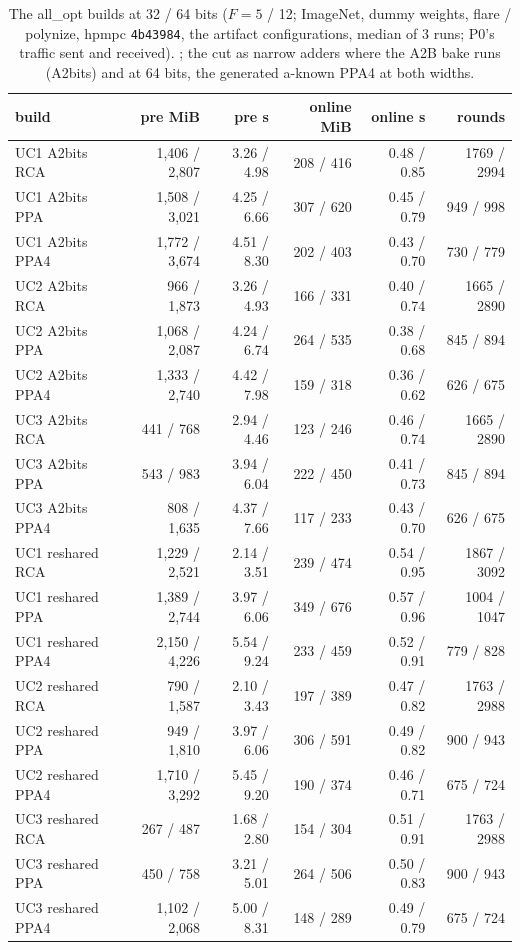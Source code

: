 \begin{table}[t]
\centering\small
\begin{tabular}{@{}lrrrrr@{}}
\toprule
build & pre MiB & pre s & online MiB & online s & rounds\\
\midrule
UC1 A2bits RCA & 1{,}406 / 2{,}807 & 3.26 / 4.98 & 208 / 416 & 0.48 / 0.85 & 1769 / 2994\\
UC1 A2bits PPA & 1{,}508 / 3{,}021 & 4.25 / 6.66 & 307 / 620 & 0.45 / 0.79 & 949 / 998\\
UC1 A2bits PPA4 & 1{,}772 / 3{,}674 & 4.51 / 8.30 & 202 / 403 & 0.43 / 0.70 & 730 / 779\\
UC2 A2bits RCA & 966 / 1{,}873 & 3.26 / 4.93 & 166 / 331 & 0.40 / 0.74 & 1665 / 2890\\
UC2 A2bits PPA & 1{,}068 / 2{,}087 & 4.24 / 6.74 & 264 / 535 & 0.38 / 0.68 & 845 / 894\\
UC2 A2bits PPA4 & 1{,}333 / 2{,}740 & 4.42 / 7.98 & 159 / 318 & 0.36 / 0.62 & 626 / 675\\
UC3 A2bits RCA & 441 / 768 & 2.94 / 4.46 & 123 / 246 & 0.46 / 0.74 & 1665 / 2890\\
UC3 A2bits PPA & 543 / 983 & 3.94 / 6.04 & 222 / 450 & 0.41 / 0.73 & 845 / 894\\
UC3 A2bits PPA4 & 808 / 1{,}635 & 4.37 / 7.66 & 117 / 233 & 0.43 / 0.70 & 626 / 675\\
\addlinespace
UC1 reshared RCA & 1{,}229 / 2{,}521 & 2.14 / 3.51 & 239 / 474 & 0.54 / 0.95 & 1867 / 3092\\
UC1 reshared PPA & 1{,}389 / 2{,}744 & 3.97 / 6.06 & 349 / 676 & 0.57 / 0.96 & 1004 / 1047\\
UC1 reshared PPA4 & 2{,}150 / 4{,}226 & 5.54 / 9.24 & 233 / 459 & 0.52 / 0.91 & 779 / 828\\
UC2 reshared RCA & 790 / 1{,}587 & 2.10 / 3.43 & 197 / 389 & 0.47 / 0.82 & 1763 / 2988\\
UC2 reshared PPA & 949 / 1{,}810 & 3.97 / 6.06 & 306 / 591 & 0.49 / 0.82 & 900 / 943\\
UC2 reshared PPA4 & 1{,}710 / 3{,}292 & 5.45 / 9.20 & 190 / 374 & 0.46 / 0.71 & 675 / 724\\
UC3 reshared RCA & 267 / 487 & 1.68 / 2.80 & 154 / 304 & 0.51 / 0.91 & 1763 / 2988\\
UC3 reshared PPA & 450 / 758 & 3.21 / 5.01 & 264 / 506 & 0.50 / 0.83 & 900 / 943\\
UC3 reshared PPA4 & 1{,}102 / 2{,}068 & 5.00 / 8.31 & 148 / 289 & 0.49 / 0.79 & 675 / 724\\
\bottomrule
\end{tabular}
\caption{The all\_opt builds at 32 / 64 bits ($F = 5$ / 12; ImageNet, dummy weights, flare / polynize, hpmpc \texttt{4b43984},
the artifact configurations, median of 3 runs; P0's traffic sent and received). ; the cut as narrow adders
where the A2B bake runs (A2bits) and at 64 bits, the generated a-known PPA4 at both widths.}
\label{tab:bit64}
\end{table}

